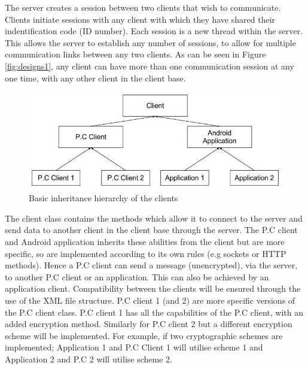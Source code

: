 \documentclass[a4paper,11pt]{article}
\begin{document}
The server creates a session between two clients that wish to communicate. Clients initiate sessions with any client with which they have shared their indentification code (ID number). Each session is a new thread within the server. This allows the server to establish any number of sessions, to allow for multiple communication links between any two clients. As can be seen in Figure \ref{fig:designs1}, any client can have more than one communication session at any one time, with any other client in the client base.

\begin{figure}[htb]
\centering
\includegraphics[scale=0.35]{designs2.jpg}
\caption{Basic inheritance hierarchy of the clients}
\label{fig:designs2}
\end{figure}

The client class contains the methods which allow it to connect to the server and send data to another client in the client base through the server. The P.C client and Android application inherits these abilities from the client but are more specific, so are implemented according to its own rules (e.g sockets or HTTP methods). Hence a P.C client can send a message (unencrypted), via the server, to another P.C client or an application. This can also be achieved by an application client. Compatibility between the clients will be ensured through the use of the XML file structure. P.C client 1 (and 2) are more specific versions of the P.C client class. P.C client 1 has all the capabilities of the P.C client, with an added encryption method. Similarly for P.C client 2 but a different encryption scheme will be implemented. For example, if two cryptographic schemes are implemented; Application 1 and P.C Client 1 will utilise scheme 1 and Application 2 and P.C 2 will utilise scheme 2. 
\end{document}
